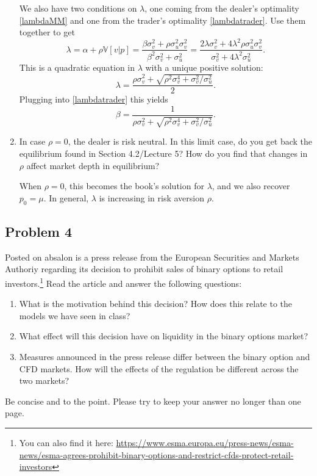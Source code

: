 \documentclass[11pt
, answers
]{exam}
\begin{document}
\begin{enumerate}[label=(\alph*). ]
\begin{solution}
We also have two conditions on $\lambda$, one coming from the dealer's optimality \eqref{lambdaMM} and one from the trader's optimality \eqref{lambdatrader}. Use them together to get
\[
\lambda =  \alpha + \rho \mathbb{V}[v|p] = \frac{\beta \sigma^{2}_{v} + \rho \sigma^{2}_{u} \sigma^{2}_{v}}{\beta^{2}\sigma^{2}_{v}+\sigma^{2}_{u}} = \frac{2\lambda \sigma^{2}_{v}+4\lambda^{2}\rho \sigma^{2}_{u}\sigma^{2}_{v}}{\sigma^{2}_{v}+4\lambda^{2} \sigma^{2}_{u}}.
\]
This is a quadratic equation in $\lambda$ with a unique positive solution:
\begin{equation} \label{eq:eqlambda}
\lambda = \frac{\rho \sigma^{2}_{v} + \sqrt{\rho^{2} \sigma^{4}_{v} + \sigma^{2}_{v}/ \sigma^{2}_{u}}}{2}.
\end{equation}
Plugging into \eqref{lambdatrader} this yields
\begin{equation} \label{eq:eqbeta}
\beta = \frac{1}{\rho \sigma^{2}_{v} + \sqrt{\rho^{2} \sigma^{4}_{v} + \sigma^{2}_{v}/ \sigma^{2}_{u}}}.
\end{equation}

\end{solution}

\item In case $\rho= 0$, the dealer is risk neutral. In this limit case, do you get back the equilibrium found in Section 4.2/Lecture 5? How do you find that changes in $\rho$ affect market depth in equilibrium?

\begin{solution}
When $\rho=0$, this becomes the book's solution for $\lambda$, and we also recover $p_{0}=\mu$. In general, $\lambda$ is increasing in risk aversion $\rho$.
\end{solution}

\end{enumerate}



\qquad
\subsection*{Problem 4}


Posted on absalon is a press release from the European Securities and Markets Authoriy regarding its decision to prohibit sales of binary options to retail investors.\footnote{You can also find it here: \url{https://www.esma.europa.eu/press-news/esma-news/esma-agrees-prohibit-binary-options-and-restrict-cfds-protect-retail-investors}} Read the article and answer the following questions:
\begin{enumerate}
	\item What is the motivation behind this decision? How does this relate to the models we have seen in class?
	\item What effect will this decision have on liquidity in the binary options market?
	\item Measures announced in the press release differ between the binary option and CFD markets. How will the effects of the regulation be different across the two markets?
\end{enumerate}
Be concise and to the point. Please try to keep your answer no longer than one page.
\end{document}
